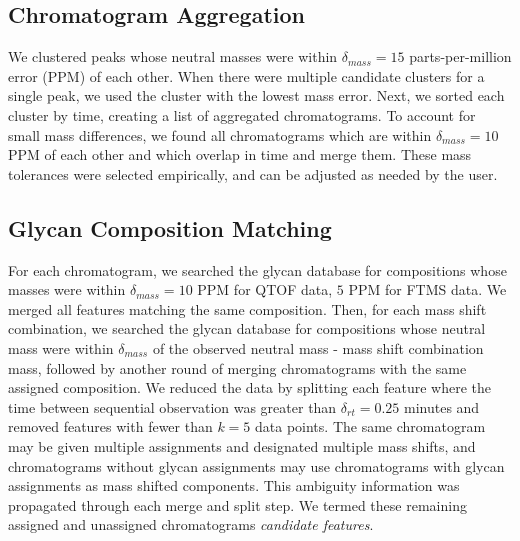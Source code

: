 \subsection{Chromatogram Aggregation}
    We clustered peaks whose neutral masses were within $\delta_{mass} = 15$ parts-per-million error
    (PPM) of each other. When there were multiple candidate clusters for a single peak,
    we used the cluster with the lowest mass error. Next, we sorted each cluster by time,
    creating a list of aggregated chromatograms. To account for small mass differences,
    we found all chromatograms which are within $\delta_{mass} = 10$ PPM of each other and which overlap
    in time and merge them. These mass tolerances were selected empirically, and can be
    adjusted as needed by the user.

\subsection{Glycan Composition Matching}
    For each chromatogram, we searched the glycan database for compositions
    whose masses were within $\delta_{mass} = 10$ PPM for QTOF data, $5$ PPM
    for FTMS data. We merged all features matching the same composition. Then, for
    each mass shift combination, we searched the glycan database for compositions
    whose neutral mass were within $\delta_{mass}$ of the observed neutral mass - mass shift
    combination mass, followed by another round of merging chromatograms with the same
    assigned composition. We reduced the data by splitting each feature where the time
    between sequential observation was greater than $\delta_{rt} = 0.25$ minutes and
    removed features with fewer than $k = 5$ data points. The same chromatogram may be
    given multiple assignments and designated multiple mass shifts, and chromatograms
    without glycan assignments may use chromatograms with glycan assignments as mass shifted
    components. This ambiguity information was propagated through each merge and split step.%
    We termed these remaining assigned and unassigned chromatograms \textit{candidate features}.
